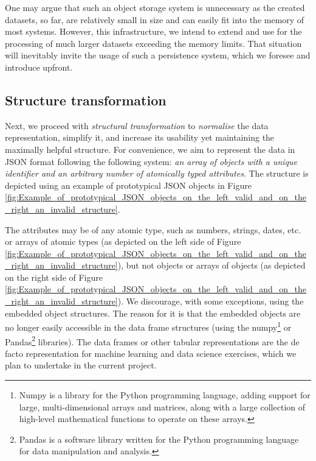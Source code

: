 One may argue that such an object storage system is unnecessary as the created datasets, so far, are relatively small in size and can easily fit into the memory of most systems. However, this infrastructure, we intend to extend and use for the processing of much larger datasets exceeding the memory limits. That situation will inevitably invite the usage of such a persistence system, which we foresee and introduce upfront.

\subsection{Structure transformation}

Next, we proceed with \textit{structural transformation} to \textit{normalise} the data representation, simplify it, and increase its usability yet maintaining the maximally helpful structure. For convenience, we aim to represent the data in JSON format following the following system: \textit{an array of objects with a unique identifier and an arbitrary number of atomically typed attributes}. The structure is depicted using an example of prototypical JSON objects in Figure \ref{fig:Example_of_prototypical_JSON_objects_on_the_left_valid_and_on_the_right_an_invalid_structure}. 

The attributes may be of any atomic type, such as numbers, strings, dates, etc. or arrays of atomic types (as depicted on the left side of Figure \ref{fig:Example_of_prototypical_JSON_objects_on_the_left_valid_and_on_the_right_an_invalid_structure}), but not objects or arrays of objects (as depicted on the right side of Figure \ref{fig:Example_of_prototypical_JSON_objects_on_the_left_valid_and_on_the_right_an_invalid_structure}). We discourage, with some exceptions, using the embedded object structures. The reason for it is that the embedded objects are no longer easily accessible in the data frame structures (using the numpy\footnote{ Numpy is a library for the Python programming language, adding support for large, multi-dimensional arrays and matrices, along with a large collection of high-level mathematical functions to operate on these arrays. } or Pandas\footnote{ Pandas is a software library written for the Python programming language for data manipulation and analysis. } libraries). The data frames or other tabular representations are the de facto representation for machine learning and data science exercises, which we plan to undertake in the current project.

